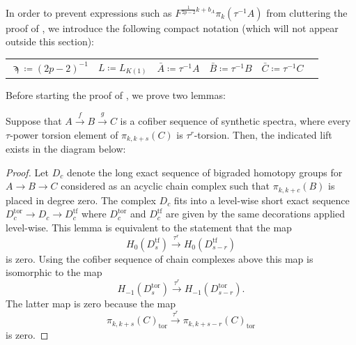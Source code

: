 In order to prevent expressions such as $F^{\frac{1}{2p-2}k + b_A}\pi_k(\tau^{-1}A)$ from cluttering the proof of , we introduce the following compact notation (which will not appear outside this section):
\begin{center}
  \begin{tabular}{cc cc cc}
    $\sampi \coloneqq (2p-2)^{-1}$ & $L \coloneqq L_{K(1)}$ &  
    $\bar{A} \coloneqq \tau^{-1}A$ & $\bar{B} \coloneqq \tau^{-1}B$ & $\bar{C} \coloneqq \tau^{-1}C$ \\
  \end{tabular}
\end{center}

Before starting the proof of , we prove two lemmas:

\begin{lem}\label{lemm:lift-filt-bnd}
  Suppose that $A \xrightarrow{f} B \xrightarrow{g} C$ is a cofiber sequence of synthetic spectra,
  where every $\tau$-power torsion element of $\pi_{k,k+s} (C)$ is $\tau^{r}$-torsion.
  Then, the indicated lift exists in the diagram below:
\begin{center}
\end{center}
\end{lem}

\begin{proof}
  Let $D_c$ denote the long exact sequence of bigraded homotopy groups for $A \to B \to C$ considered as an acyclic chain complex such that $\pi_{k,k+c}(B)$ is placed in degree zero. The complex $D_c$ fits into a level-wise short exact sequence $D_c^{\mathrm{tor}} \to D_c \to D_c^{\mathrm{tf}}$ where $D_c^{\mathrm{tor}}$ and $D_c^{\mathrm{tf}}$ are given by the same decorations applied level-wise. This lemma is equivalent to the statement that the map
  $$ H_0(D_s^{\mathrm{tf}}) \xrightarrow{\tau^r} H_0(D_{s-r}^{\mathrm{tf}}) $$
  is zero. Using the cofiber sequence of chain complexes above this map is isomorphic to the map
  $$ H_{-1}(D_s^{\mathrm{tor}}) \xrightarrow{\tau^r} H_{-1}(D_{s-r}^{\mathrm{tor}}). $$
  The latter map is zero because the map
  $$ \pi_{k,k+s}(C)_{\mathrm{tor}} \xrightarrow{\tau^r} \pi_{k,k+s-r}(C)_{\mathrm{tor}} $$
  is zero.
\end{proof}

